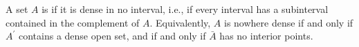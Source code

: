 A set $A$ is  if it is dense in no interval, i.e., if every interval has a subinterval contained in the complement of $A$. Equivalently, $A$ is nowhere dense if and only if $A^\prime$ contains a dense open set, and if and only if $\bar{A}$ has no interior points.
